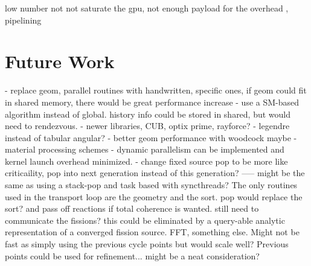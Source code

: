 low number not not saturate the gpu, not enough payload for the overhead , pipelining

\section{Future Work}

- replace geom, parallel routines with handwritten, specific ones, if geom could fit in shared memory, there would be great performance increase
- use a SM-based algorithm instead of global.  history info could be stored in shared, but would need to rendezvous.
- newer libraries, CUB, optix prime, rayforce?
- legendre instead of tabular angular?
- better geom performance with woodcock maybe
- material processing schemes
- dynamic parallelism can be implemented and kernel launch overhead minimized.  
- change fixed source pop to be more like criticaility, pop into next generation instead of this generation?
-----  might be the same as using a stack-pop and task based with syncthreads?  The only routines used in the transport loop are the geometry and the sort.   pop would replace the sort?  and pass off reactions if total coherence is wanted.  still need to communicate the fissions?  this could be eliminated by a query-able analytic representation of a converged fission source.  FFT, something else.  Might not be fast as simply using the previous cycle points but would scale well?  Previous points could be used for refinement...  might be a neat consideration?